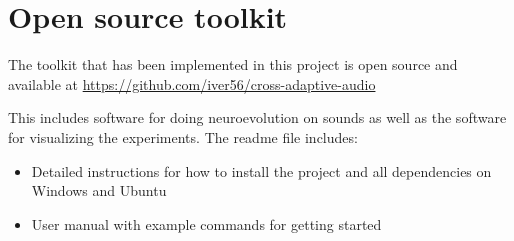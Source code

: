 
\chapter{Open source toolkit}
\label{appendix:toolkit}
The toolkit that has been implemented in this project is open source and available at \hfill \break
\url{https://github.com/iver56/cross-adaptive-audio}

This includes software for doing neuroevolution on sounds as well as the software for visualizing the experiments. The readme file includes:

\begin{itemize}  
\item Detailed instructions for how to install the project and all dependencies on Windows and Ubuntu
\item User manual with example commands for getting started
\end{itemize}
